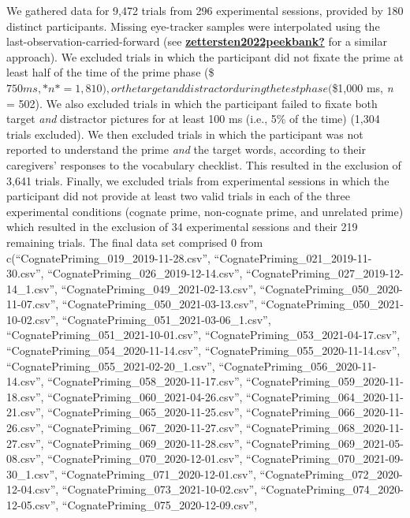 \documentclass[
  letterpaper,
  DIV=11,
  numbers=noendperiod]{scrartcl}
\begin{document}
We gathered data for 9,472 trials from 296 experimental sessions,
provided by 180 distinct participants. Missing eye-tracker samples were
interpolated using the last-observation-carried-forward (see
\protect\hyperlink{ref-zettersten2022peekbank}{\textbf{zettersten2022peekbank?}}
for a similar approach). We excluded trials in which the participant did
not fixate the prime at least half of the time of the prime phase
(\$\geq\(750 ms, *n* = 1,810), or the target and distractor during the test phase (\)\geq\$1,000
ms, \emph{n} = 502). We also excluded trials in which the participant
failed to fixate both target \emph{and} distractor pictures for at least
100 ms (i.e., 5\% of the time) (1,304 trials excluded). We then excluded
trials in which the participant was not reported to understand the prime
\emph{and} the target words, according to their caregivers' responses to
the vocabulary checklist. This resulted in the exclusion of 3,641
trials. Finally, we excluded trials from experimental sessions in which
the participant did not provide at least two valid trials in each of the
three experimental conditions (cognate prime, non-cognate prime, and
unrelated prime) which resulted in the exclusion of 34 experimental
sessions and their 219 remaining trials. The final data set comprised 0
from c(``CognatePriming\_019\_2019-11-28.csv'',
``CognatePriming\_021\_2019-11-30.csv'',
``CognatePriming\_026\_2019-12-14.csv'',
``CognatePriming\_027\_2019-12-14\_1.csv'',
``CognatePriming\_049\_2021-02-13.csv'',
``CognatePriming\_050\_2020-11-07.csv'',
``CognatePriming\_050\_2021-03-13.csv'',
``CognatePriming\_050\_2021-10-02.csv'',
``CognatePriming\_051\_2021-03-06\_1.csv'',
``CognatePriming\_051\_2021-10-01.csv'',
``CognatePriming\_053\_2021-04-17.csv'',
``CognatePriming\_054\_2020-11-14.csv'',
``CognatePriming\_055\_2020-11-14.csv'',
``CognatePriming\_055\_2021-02-20\_1.csv'',
``CognatePriming\_056\_2020-11-14.csv'',
``CognatePriming\_058\_2020-11-17.csv'',
``CognatePriming\_059\_2020-11-18.csv'',
``CognatePriming\_060\_2021-04-26.csv'',
``CognatePriming\_064\_2020-11-21.csv'',
``CognatePriming\_065\_2020-11-25.csv'',
``CognatePriming\_066\_2020-11-26.csv'',
``CognatePriming\_067\_2020-11-27.csv'',
``CognatePriming\_068\_2020-11-27.csv'',
``CognatePriming\_069\_2020-11-28.csv'',
``CognatePriming\_069\_2021-05-08.csv'',
``CognatePriming\_070\_2020-12-01.csv'',
``CognatePriming\_070\_2021-09-30\_1.csv'',
``CognatePriming\_071\_2020-12-01.csv'',
``CognatePriming\_072\_2020-12-04.csv'',
``CognatePriming\_073\_2021-10-02.csv'',
``CognatePriming\_074\_2020-12-05.csv'',
``CognatePriming\_075\_2020-12-09.csv'',
\end{document}
